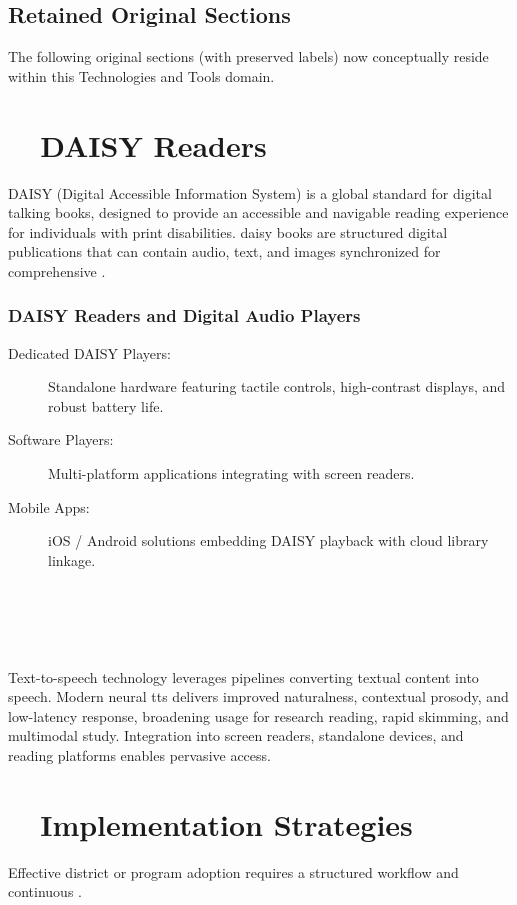 \subsection{Retained Original Sections}
The following original sections (with preserved labels) now conceptually reside within this
Technologies and Tools domain.

\section{~~DAISY Readers}\label{ch7:sec:daisy-readers}
DAISY (Digital Accessible Information System) is a global standard for digital talking books,
designed to provide an accessible and navigable reading experience for individuals with print
disabilities.\supercite{DAISY2024} \gls{daisy} books are structured digital publications that can contain
\gls{audio}, text, and images synchronized for comprehensive .\supercite{MDPI2022}

\subsubsection{DAISY Readers and Digital Audio Players}
\begin{description}
	\item[Dedicated DAISY Players:] Standalone hardware featuring tactile controls, high-contrast displays,
	      and robust battery life.
	\item[Software Players:] Multi-platform applications integrating with screen readers.
	\item[Mobile Apps:] iOS / Android solutions embedding DAISY playback with cloud library linkage.
\end{description}

\section{~~}\label{ch07:sec:tts}
Text-to-speech technology leverages  pipelines converting textual
content into speech.\supercite{VisionAid2025} Modern neural \gls{tts} delivers improved naturalness,
contextual prosody, and low-latency response, broadening usage for research reading, rapid skimming,
and multimodal study. Integration into screen readers, standalone devices, and reading platforms
enables pervasive access.

\section{~~Implementation Strategies}\label{ch07:sec:implementation-strategies}
Effective district or program adoption requires a structured workflow and continuous .

